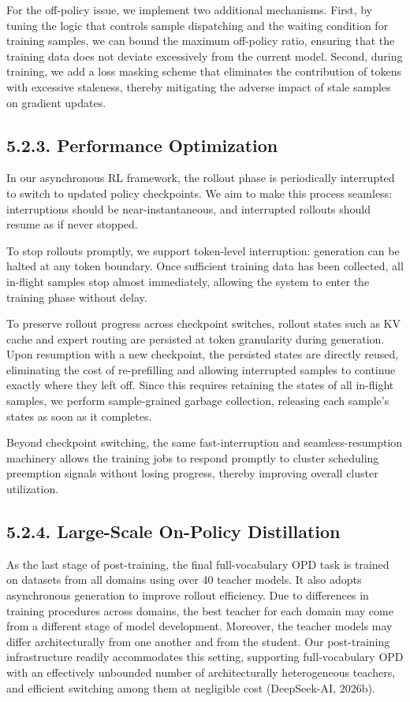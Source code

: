\documentclass[
  10
]{article}
\begin{document}
For the off-policy issue, we implement two additional mechanisms. First,
by tuning the logic that controls sample dispatching and the waiting
condition for training samples, we can bound the maximum off-policy
ratio, ensuring that the training data does not deviate excessively from
the current model. Second, during training, we add a loss masking scheme
that eliminates the contribution of tokens with excessive staleness,
thereby mitigating the adverse impact of stale samples on gradient
updates.

\subsection{5.2.3. Performance
Optimization}\label{performance-optimization}

In our asynchronous RL framework, the rollout phase is periodically
interrupted to switch to updated policy checkpoints. We aim to make this
process seamless: interruptions should be near-instantaneous, and
interrupted rollouts should resume as if never stopped.

To stop rollouts promptly, we support token-level interruption:
generation can be halted at any token boundary. Once sufficient training
data has been collected, all in-flight samples stop almost immediately,
allowing the system to enter the training phase without delay.

To preserve rollout progress across checkpoint switches, rollout states
such as KV cache and expert routing are persisted at token granularity
during generation. Upon resumption with a new checkpoint, the persisted
states are directly reused, eliminating the cost of re-prefilling and
allowing interrupted samples to continue exactly where they left off.
Since this requires retaining the states of all in-flight samples, we
perform sample-grained garbage collection, releasing each sample's
states as soon as it completes.

Beyond checkpoint switching, the same fast-interruption and
seamless-resumption machinery allows the training jobs to respond
promptly to cluster scheduling preemption signals without losing
progress, thereby improving overall cluster utilization.

\subsection{5.2.4. Large-Scale On-Policy
Distillation}\label{large-scale-on-policy-distillation}

As the last stage of post-training, the final full-vocabulary OPD task
is trained on datasets from all domains using over 40 teacher models. It
also adopts asynchronous generation to improve rollout efficiency. Due
to differences in training procedures across domains, the best teacher
for each domain may come from a different stage of model development.
Moreover, the teacher models may differ architecturally from one another
and from the student. Our post-training infrastructure readily
accommodates this setting, supporting full-vocabulary OPD with an
effectively unbounded number of architecturally heterogeneous teachers,
and efficient switching among them at negligible cost (DeepSeek-AI,
2026b).
\end{document}

